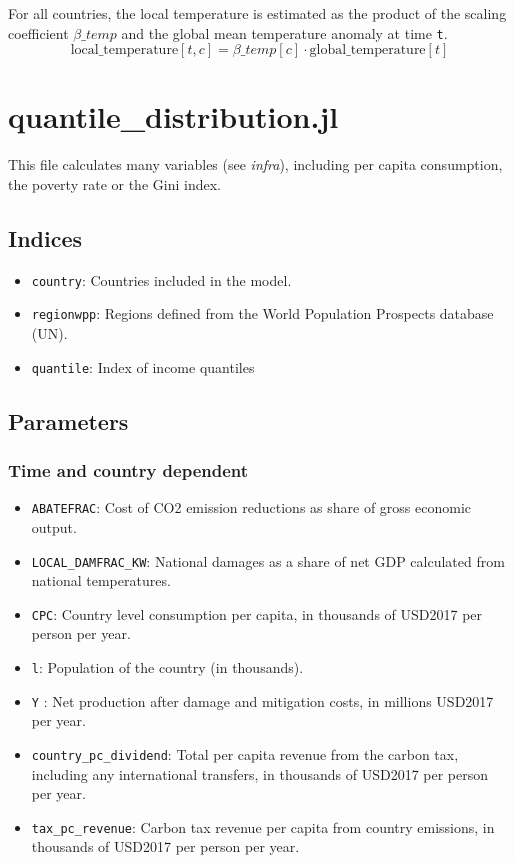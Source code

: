 \documentclass[
]{article}
\providecommand{\tightlist}{%
  \setlength{\itemsep}{0pt}\setlength{\parskip}{0pt}}
\begin{document}
For all countries, the local temperature is estimated as the product of
the scaling coefficient \(\beta\_{temp}\) and the global mean
temperature anomaly at time \texttt{t}.
\begin{equation}
 \text{local\_temperature}[t,c] = \beta\_temp[c] \cdot \text{global\_temperature}[t]
\end{equation}


\section{quantile\_distribution.jl}\label{quantile_distribution.jl}

This file calculates many variables (see \emph{infra}), including per
capita consumption, the poverty rate or the Gini index.

\subsection{Indices}\label{indices}

\begin{itemize}
\tightlist
\item
  \texttt{country}: Countries included in the model.
\item
  \texttt{regionwpp}: Regions defined from the World Population Prospects database (UN).
\item
  \texttt{quantile}: Index of income quantiles
\end{itemize}

\subsection{Parameters}\label{parameters-5}

\subsubsection{Time and country
dependent}\label{time-and-country-dependent-10}

\begin{itemize}
\tightlist
\item
  \texttt{ABATEFRAC}: Cost of CO2 emission reductions as share of gross
  economic output.
\item
  \texttt{LOCAL\_DAMFRAC\_KW}: National damages as a share of net GDP
  calculated from national temperatures.
\item
  \texttt{CPC}: Country level consumption per capita, in thousands of USD2017 per person per year.
\item
  \texttt{l}: Population of the country (in thousands).
\item
  \texttt{Y} : Net production after damage and mitigation costs, in
  millions USD2017 per year.
\item
  \texttt{country\_pc\_dividend}: Total per capita revenue from the
  carbon tax, including any international transfers, in thousands of
  USD2017 per person per year.
\item
  \texttt{tax\_pc\_revenue}: Carbon tax revenue per capita from country
  emissions, in thousands of USD2017 per person per year.
\end{itemize}
\end{document}
